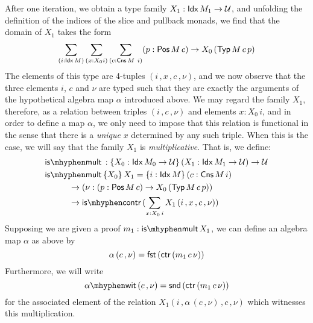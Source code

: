 After one iteration, we obtain a type family $X_1 : \mathsf{Idx}\, M_1 \to \mathcal{U}$,
and unfolding the definition of the indices of the slice and pullback
monads, we find that the domain of $X_1$ takes the form
\begin{align*}
  \sum_{(i : \mathsf{Idx}\, M)} \sum_{(x : X_0 i)}
  \sum_{(c : \mathsf{Cns}\, M\ i)} (p : \mathsf{Pos}\, M\, c) \to X_0\, (\mathsf{Typ}\, M\, c\, p)
\end{align*}
The elements of this type are 4-tuples $(i \,, x \,, c \,, \nu)$, and
we now observe that the three elements $i$, $c$ and $\nu$ are typed
such that they are exactly the arguments of the hypothetical algebra
map $\alpha$ introduced above.  We may regard the family $X_1$,
therefore, as a relation between triples $(i \,, c \,, \nu)$ and
elements $x : X_0\, i$, and in order to define a map $\alpha$, we only
need to impose that this relation is functional in the sense that
there is a \emph{unique} $x$ determined by any such triple.  When this
is the case, we will say that the family $X_1$ is
\emph{multiplicative}.  That is, we define:
\begin{align*}
  &\ismult : \{X_0 : \Idx M_0 \to \UU\}\, (X_1 : \Idx M_1 \to \UU) \to \UU \\ 
  &\ismult \{X_0\}\, X_1 = \{i : \Idx M\}\, (c : \Cns M\, i) \\
  &\hspace{1cm} \to (\nu : (p : \Pos M\, c) \to X_0\, (\Typ M\, c\, p))\\
  &\hspace{1cm} \to \iscontr (\sum_{x : X_0\, i} X_1\, (i \,, x \,, c \,, \nu))
\end{align*}
Supposing we are given a proof $m_1 : \ismult X_1$, we can define an
algebra map $\alpha$ as above by
\[\alpha\, (c \,, \nu) = \mathsf{fst}\, (\mathsf{ctr}\, (m_1\, c\, \nu)) \]
Furthermore, we will write
\[\alpha\wit\, (c \,, \nu) = \snd (\ctr (m_1\, c\, \nu)) \]
for the associated element of the relation
$X_1 (i \,, \alpha\, (c \,, \nu) \,, c \,, \nu)$ which witnesses
this multiplication.

